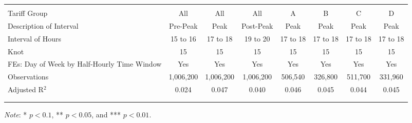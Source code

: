 {\begin{table}[t!]
\begin{adjustbox}{scale = 0.75}
\begin{threeparttable}
\begin{tabular}{@{\extracolsep{10pt}}lccccccc}
                    & & & & & & & \\
                    \hline
                    \\[-2.0ex]
                    Tariff Group & All & All & All & A & B & C & D \\
                    Description of Interval & Pre-Peak & Peak & Post-Peak & Peak & Peak & Peak & Peak \\
                    Interval of Hours & 15 to 16 & 17 to 18 & 19 to 20 & 17 to 18 & 17 to 18 & 17 to 18 & 17 to 18 \\
                    Knot & 15 & 15 & 15 & 15 & 15 & 15 & 15 \\
                    FEs: Day of Week by Half-Hourly Time Window & Yes & Yes & Yes & Yes & Yes & Yes & Yes \\
                    Observations & 1,006,200 & 1,006,200 & 1,006,200 & 506,540 & 326,800 & 511,700 & 331,960 \\
                    Adjusted R$^{2}$ & 0.024 & 0.047 & 0.040 & 0.046 & 0.045 & 0.044 & 0.045 \\
                    \\[-2.0ex]
                    \hline \hline
                    \\[-4.5ex]
                \end{tabular}
                \begin{tablenotes}[flushleft]
                    \footnotesize
                    \item \textit{Note}: * $p < 0.1$, ** $p < 0.05$, and *** $p < 0.01$.
                \end{tablenotes}
            \end{threeparttable}
        \end{adjustbox}
    \end{table}
}

